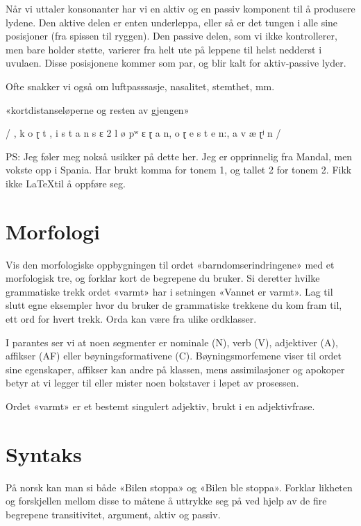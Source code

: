\documentclass{myassignment}
\begin{document}
	Når vi uttaler konsonanter har vi en aktiv og en passiv komponent til å produsere lydene. Den aktive delen er enten underleppa, eller så er det tungen i alle sine posisjoner (fra spissen til ryggen). Den passive delen, som vi ikke kontrollerer, men bare holder støtte, varierer fra helt ute på leppene til helst nedderst i uvulaen. Disse posisjonene kommer som par, og blir kalt for aktiv-passive lyder. 

	Ofte snakker vi også om luftpasssasje, nasalitet, stemthet, mm.
	
	«kortdistanseløperne og resten av gjengen»

	/ , k o ɽ t , i s t a n s ɛ 2 l ø pʷ ɛ ɽ a n, o ɽ e s t e n:, a v æ ɽʲ n /

	PS: Jeg føler meg nokså usikker på dette her. Jeg er opprinnelig fra Mandal, men vokste opp i Spania. Har brukt komma for tonem 1, og tallet 2 for tonem 2. Fikk ikke \LaTeX til å oppføre seg.

	\pagebreak
	\section{Morfologi}
	\begin{problem}
	Vis den morfologiske oppbygningen til ordet «barndomserindringene» med et morfologisk tre, og forklar kort de begrepene du bruker. Si deretter hvilke grammatiske trekk ordet «varmt» har i setningen «Vannet er varmt». Lag til slutt egne eksempler hvor du bruker de grammatiske trekkene du kom fram til, ett ord for hvert trekk. Orda kan være fra ulike ordklasser.
	\end{problem}

	I parantes ser vi at noen segmenter er nominale (N), verb (V), adjektiver (A), affikser (AF) eller bøyningsformativene (C). Bøyningsmorfemene viser til ordet sine egenskaper, affikser kan andre på klassen, mens assimilasjoner og apokoper betyr at vi legger til eller mister noen bokstaver i løpet av prosessen.

	Ordet «varmt» er et bestemt singulert adjektiv, brukt i en adjektivfrase.


	\section{Syntaks}
	\begin{problem}
	På norsk kan man si både «Bilen stoppa» og «Bilen ble stoppa». Forklar likheten og forskjellen mellom disse to måtene å uttrykke seg på ved hjelp av de fire begrepene transitivitet, argument, aktiv og passiv.	\end{problem}
\end{document}
